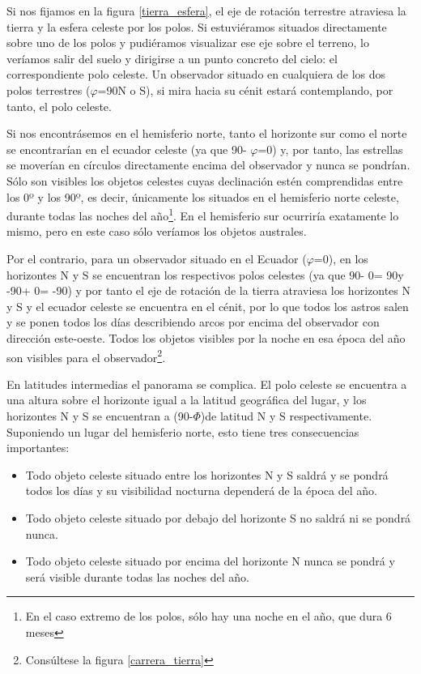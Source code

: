 \documentclass[12pt]{memoir}
\begin{document}
Si nos fijamos en la figura \ref{tierra_esfera}, el eje de rotación terrestre atraviesa la tierra y la esfera celeste por los polos. Si estuviéramos situados directamente sobre uno de los polos y pudiéramos visualizar ese eje sobre el terreno, lo veríamos salir del suelo y dirigirse a un punto concreto del cielo: el correspondiente polo celeste. Un observador situado en cualquiera de los dos polos terrestres ($\varphi$=90\textdegree  N o S), si mira hacia su cénit estará contemplando, por tanto, el polo celeste. 

Si nos encontrásemos en el hemisferio norte, tanto el horizonte sur como el norte se encontrarían en el ecuador celeste (ya que 90\textdegree - $\varphi$=0\textdegree) y, por tanto, las estrellas se moverían en círculos directamente encima del  observador y nunca se pondrían. Sólo son visibles los objetos celestes cuyas declinación estén comprendidas entre los 0º y los 90º, es decir, únicamente los situados en el hemisferio norte celeste, durante todas las noches del año\footnote{En el caso extremo de los polos, sólo hay una noche en el año, que dura 6 meses}. En el hemisferio sur ocurriría exatamente lo mismo, pero en este caso sólo veríamos los objetos australes.

Por el contrario, para un observador situado en el Ecuador ($\varphi$=0\textdegree), en los horizontes N y S se encuentran los respectivos polos celestes (ya que 90\textdegree - 0\textdegree = 90\textdegree y -90\textdegree + 0\textdegree = -90\textdegree) y por tanto el eje de rotación de la tierra atraviesa los horizontes N y S y el ecuador celeste se encuentra en el cénit, por lo que todos los astros salen y se ponen todos los días describiendo arcos por encima del observador con dirección este-oeste. Todos los objetos visibles por la noche en esa época del año son visibles para el observador\footnote{Consúltese la figura \ref{carrera_tierra}}.

En latitudes intermedias el panorama se complica. El polo celeste se encuentra a una altura sobre el horizonte igual a la latitud geográfica del lugar, y los horizontes N y S se encuentran a (90-$\Phi$)\textdegree de latitud N y S respectivamente. Suponiendo un lugar del hemisferio norte, esto tiene tres consecuencias importantes:

\begin{itemize}
 \item Todo objeto celeste situado entre los horizontes N y S saldrá y se pondrá todos los días y su visibilidad nocturna dependerá de la época del año.
 \item Todo objeto celeste situado por debajo del horizonte S no saldrá ni se pondrá nunca.
 \item Todo objeto celeste situado por encima del horizonte N nunca se pondrá y será visible durante todas las noches del año.
\end{itemize}
\end{document}
